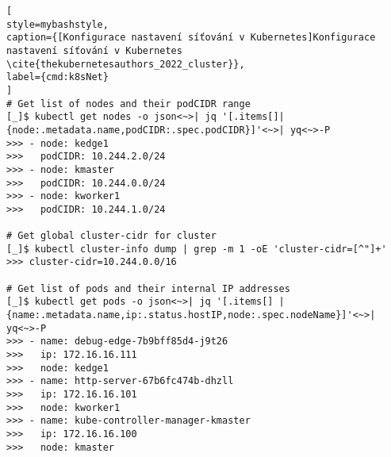 \begin{lstfloat}
\begin{lstlisting}[
style=mybashstyle,
caption={[Konfigurace nastavení síťování v Kubernetes]Konfigurace nastavení síťování v Kubernetes \cite{thekubernetesauthors_2022_cluster}},
label={cmd:k8sNet}
]
# Get list of nodes and their podCIDR range
[_]$ kubectl get nodes -o json<~>| jq '[.items[]|{node:.metadata.name,podCIDR:.spec.podCIDR}]'<~>| yq<~>-P
>>> - node: kedge1
>>>   podCIDR: 10.244.2.0/24
>>> - node: kmaster
>>>   podCIDR: 10.244.0.0/24
>>> - node: kworker1
>>>   podCIDR: 10.244.1.0/24

# Get global cluster-cidr for cluster
[_]$ kubectl cluster-info dump | grep -m 1 -oE 'cluster-cidr=[^"]+'
>>> cluster-cidr=10.244.0.0/16

# Get list of pods and their internal IP addresses  
[_]$ kubectl get pods -o json<~>| jq '[.items[] | {name:.metadata.name,ip:.status.hostIP,node:.spec.nodeName}]'<~>| yq<~>-P
>>> - name: debug-edge-7b9bff85d4-j9t26
>>>   ip: 172.16.16.111
>>>   node: kedge1
>>> - name: http-server-67b6fc474b-dhzll
>>>   ip: 172.16.16.101
>>>   node: kworker1
>>> - name: kube-controller-manager-kmaster
>>>   ip: 172.16.16.100
>>>   node: kmaster
\end{lstlisting}
\end{lstfloat}
